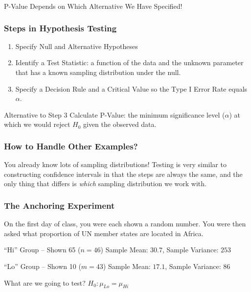 \documentclass[handout]{beamer}
\begin{document}
\begin{frame}
\begin{center}
\huge P-Value Depends on Which Alternative We Have Specified!
\end{center}
\end{frame}

\begin{frame}
\frametitle{Steps in Hypothesis Testing}

\begin{enumerate}
\item Specify Null and Alternative Hypotheses
\item Identify a Test Statistic: a function of the data and the unknown parameter that has a known sampling distribution under the null.
\item Specify a Decision Rule and a Critical Value so the Type I Error Rate equals $\alpha$.
\end{enumerate}

\begin{alertblock}{Alternative to Step 3}
	Calculate P-Value: the minimum significance level  ($\alpha$) at which we would reject $H_0$ given the observed data.
\end{alertblock}

\end{frame}


\begin{frame}
\frametitle{How to Handle Other Examples?}

\alert{You already know lots of sampling distributions! Testing is very similar to constructing confidence intervals in that the steps are always the same, and the only thing that differs is \emph{which} sampling distribution we work with.}

\end{frame}


\begin{frame}
\frametitle{The Anchoring Experiment}
On the first day of class, you were each shown a random number. You were then asked what proportion of UN member states are located in Africa. 

	\begin{block}{``Hi'' Group -- Shown 65 ($n=46$)}
		Sample Mean: $30.7$, Sample Variance: $253$
\end{block}


	\begin{block}{``Lo'' Group -- Shown 10 ($m=43$)}
	Sample Mean: $17.1$, Sample Variance: $86$
\end{block}

\begin{alertblock}{What are we going to test?}
	$H_0\colon \mu_{Lo} = \mu_{Hi}$
\end{alertblock}
\end{frame}
\end{document}
